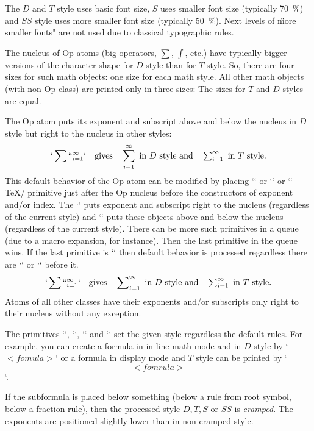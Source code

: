 The $D$ and $T$ style uses basic font size, $S$ uses smaller font size (typically
70~\%) and $SS$ style uses more smaller font size (typically 50~\%). Next
levels of \"more smaller fonts" are not used due to classical typographic rules.

The nucleus of Op atoms (big operators, $\sum$, $\int$, etc.) have typically bigger versions
of the character shape for $D$ style than for $T$ style. 
So, there are four sizes for such math
objects: one size for each math style. All other math objects (with non Op
class) are printed only in three sizes: The sizes for $T$ and $D$ styles are equal.

The Op atom puts its exponent and subscript above and below the nucleus in $D$
style but right to the nucleus in other styles:
$$
  `\sum``_{i=1}^\infty` \quad \hbox{gives}\quad \sum_{i=1}^\infty \hbox{ in $D$ style and}
  \quad \textstyle \sum_{i=1}^\infty \hbox{ in $T$ style}.
$$
This default behavior of the Op atom
can be modified by placing `\limits` or `\nolimits` or
`\displaylimits` \TeX/ primitive just after the Op nucleus before the constructors
of exponent and/or index. The `\nolimits` puts exponent and subscript right
to the nucleus (regardless of the current style) and `\limits` puts these
objects above and below the nucleus (regardless of the current style). There
can be more such primitives in a queue (due to a macro expansion, for
instance). Then the last primitive in the queue wins.
If the last primitive is `\displaylimits` then
default behavior is processed regardless there are `\limits` or `\nolimits`
before it.
$$
  `\sum\nolimits``_{i=1}^\infty` \quad \hbox{gives}\quad \sum\nolimits_{i=1}^\infty
  \hbox{ in $D$ style and}\quad \textstyle\sum\nolimits_{i=1}^\infty
  \hbox{ in $T$ style}.
$$
Atoms of all other classes have their exponents and/or subscripts only right
to their nucleus without any exception.

The primitives `\displaystyle`, `\textstyle`, `\scriptstyle` and
`\scriptscriptstyle` set the given style regardless the default rules. For
example, you can create a formula in in-line math mode and in $D$ style by
`$\displaystyle <fomula>$` or a formula in display mode and $T$ style can be printed
by `$$\textstyle <fomrula>$$`.

If the subformula is placed below something (below a rule from root symbol,
below a fraction rule), then the processed style $D, T, S$ or $SS$ is {\em cramped}.
The exponents are positioned slightly lower than in non-cramped style.

